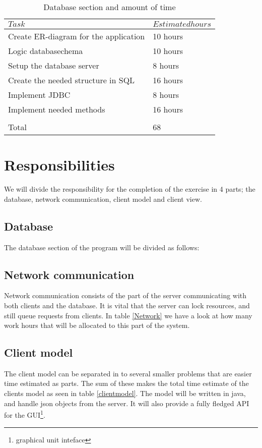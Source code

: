 \documentclass[a4paper, english, 12pt]{article}
\begin{document}
\begin{table}[h]
    \begin{center}
    \caption{Database section and amount of time} 
    \label{database}
    \vspace{0,5cm}
    \begin{tabular}{ll} \\ 
        \hline
        $Task$ & $Estimated hours$\\
        \hline 
    Create ER-diagram for the application & 10 hours\\
    Logic databasechema & 10 hours\\    
    Setup the database server & 8 hours\\
    Create the needed structure in SQL & 16 hours\\
    Implement JDBC & 8 hours\\
    Implement needed methods & 16 hours\\
	\hline \\
	Total & 68
        \hline
    \end{tabular}
    \end{center}
\end{table}

\section{Responsibilities}
We will divide the responsibility for the completion of the exercise in 4 parts; the database, network communication, 
client model and client view. 
\subsection{Database}
The database section of the program will be divided as follows:



\subsection{Network communication}
Network communication consists of the part of the server communicating with both clients and the database. It is vital that the server can lock resources, and still queue requests from clients. In table \ref{Network} we have a look at how many work hours that will be allocated to this part of the system.



\subsection{Client model}
The client model can be separated in to several smaller problems that are easier time estimated as parts. The sum of these makes the total time estimate of the clients model as seen in table \ref{clientmodel}. The model will be written in java, and handle json objects from the server. It will also provide a fully fledged API for the GUI\footnote{graphical unit inteface}. 
\end{document}
